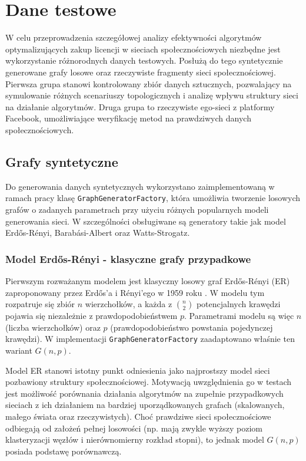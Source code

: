 \chapter{Dane testowe}
 W celu przeprowadzenia szczegółowej analizy efektywności algorytmów optymalizujących zakup licencji w sieciach społecznościowych niezbędne jest wykorzystanie różnorodnych danych testowych. Posłużą do tego syntetycznie generowane grafy losowe oraz rzeczywiste fragmenty sieci społecznościowej. Pierwsza grupa stanowi kontrolowany zbiór danych sztucznych, pozwalający na symulowanie różnych scenariuszy topologicznych i analizę wpływu struktury sieci na działanie algorytmów. Druga grupa to rzeczywiste ego-sieci z platformy Facebook, umożliwiające weryfikację metod na prawdziwych danych społecznościowych.

\section{Grafy syntetyczne}

Do generowania danych syntetycznych wykorzystano zaimplementowaną w ramach pracy klasę \texttt{GraphGeneratorFactory}, która umożliwia tworzenie losowych grafów o zadanych parametrach przy użyciu różnych popularnych modeli generowania sieci. W szczególności obsługiwane są generatory takie jak model Erd\H{o}s-Rényi, Barabási-Albert oraz Watts-Strogatz.

\subsection{Model Erd\H{o}s-Rényi - klasyczne grafy przypadkowe}
Pierwszym rozważanym modelem jest klasyczny losowy graf Erd\H{o}s-Rényi (ER) zaproponowany przez Erd\H{o}s’a i Rényi’ego w 1959 roku \cite{ErdosRenyi1960}. W modelu tym rozpatruje się zbiór $n$ wierzchołków, a każda z $\binom{n}{2}$ potencjalnych krawędzi pojawia się niezależnie z prawdopodobieństwem $p$. Parametrami modelu są więc $n$ (liczba wierzchołków) oraz $p$ (prawdopodobieństwo powstania pojedynczej krawędzi). W implementacji \texttt{GraphGeneratorFactory} zaadaptowano właśnie ten wariant $G(n,p)$.


Model ER stanowi istotny punkt odniesienia jako najprostszy model sieci pozbawiony struktury społecznościowej. Motywacją uwzględnienia go w testach jest możliwość porównania działania algorytmów na zupełnie przypadkowych sieciach z ich działaniem na bardziej uporządkowanych grafach (skalowanych, małego świata oraz rzeczywistych). Choć prawdziwe sieci społecznościowe odbiegają od założeń pełnej losowości (np. mają zwykle wyższy poziom klasteryzacji węzłów i nierównomierny rozkład stopni), to jednak model $G(n, p)$ posiada podstawę porównawczą.

